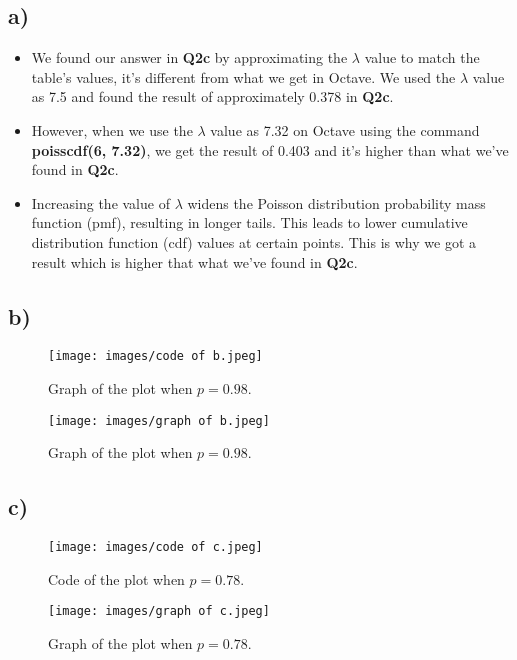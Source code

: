 \documentclass[12pt]{article}
\begin{document}
\subsection*{a)} 
\begin{itemize}
 \item We found our answer in \textbf{Q2c} by approximating the $\lambda$ value to match the table's values, it's different from what we get in Octave. We used the $\lambda$ value as 7.5 and found the result of approximately 0.378 in \textbf{Q2c}.
 \item However, when we use the $\lambda$ value as 7.32 on Octave using the command \textbf{poisscdf(6, 7.32)}, we get the result of 0.403 and it's higher than what we've found in \textbf{Q2c}.
 \item Increasing the value of $\lambda$ widens the Poisson distribution probability mass function (pmf), resulting in longer tails. This leads to lower cumulative distribution function (cdf) values at certain points. This is why we got a result which is higher that what we've found in \textbf{Q2c}.
\end{itemize}

\subsection*{b)}

\begin{figure}[H]
    \centering
    \texttt{[image: images/code of b.jpeg]}
    \caption{Graph of the plot when $p = 0.98$.}
    \label{fig:example_b}
\end{figure}
\begin{figure}[H]
    \centering
    \texttt{[image: images/graph of b.jpeg]}
    \caption{Graph of the plot when $p = 0.98$.}
    \label{fig:example_b_graph}
\end{figure}

\subsection*{c)}

\begin{figure}[H]
    \centering
    \texttt{[image: images/code of c.jpeg]}
    \caption{Code of the plot when $p = 0.78$.}
    \label{fig:example_c}
\end{figure}

\begin{figure}[H]
    \centering
    \texttt{[image: images/graph of c.jpeg]}
    \caption{Graph of the plot when $p = 0.78$.}
    \label{fig:example_c_graph}
\end{figure}
\end{document}
